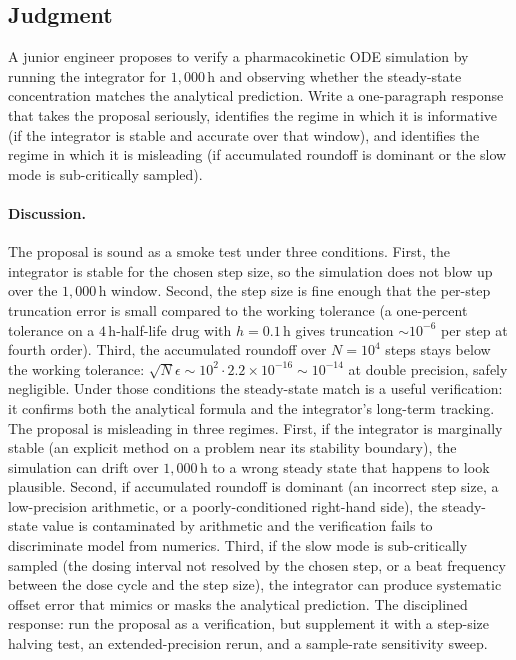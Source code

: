 \subsection*{Judgment}

\begin{exercise}
A junior engineer proposes to verify a pharmacokinetic ODE
simulation by running the integrator for $1{,}000\,\si{\hour}$
and observing whether the steady-state concentration matches the
analytical prediction. Write a one-paragraph response that takes
the proposal seriously, identifies the regime in which it is
informative (if the integrator is stable and accurate over that
window), and identifies the regime in which it is misleading (if
accumulated roundoff is dominant or the slow mode is sub-critically
sampled).

\paragraph{Discussion.} The proposal is sound as a smoke test
under three conditions. First, the integrator is stable for
the chosen step size, so the simulation does not blow up over
the $1{,}000\,\si{\hour}$ window. Second, the step size is fine
enough that the per-step truncation error is small compared to
the working tolerance (a one-percent tolerance on a $4\,\si{
\hour}$-half-life drug with $h = 0.1\,\si{\hour}$ gives
truncation $\sim 10^{-6}$ per step at fourth order). Third, the
accumulated roundoff over $N = 10^{4}$ steps stays below the
working tolerance: $\sqrt{N} \epsilon \sim 10^{2} \cdot 2.2
\times 10^{-16} \sim 10^{-14}$ at double precision, safely
negligible. Under those conditions the steady-state match is a
useful verification: it confirms both the analytical formula
and the integrator's long-term tracking. The proposal is
misleading in three regimes. First, if the integrator is
marginally stable (an explicit method on a problem near its
stability boundary), the simulation can drift over $1{,}000\,
\si{\hour}$ to a wrong steady state that happens to look
plausible. Second, if accumulated roundoff is dominant (an
incorrect step size, a low-precision arithmetic, or a
poorly-conditioned right-hand side), the steady-state value is
contaminated by arithmetic and the verification fails to
discriminate model from numerics. Third, if the slow mode is
sub-critically sampled (the dosing interval not resolved by the
chosen step, or a beat frequency between the dose cycle and the
step size), the integrator can produce systematic offset error
that mimics or masks the analytical prediction. The disciplined
response: run the proposal as a verification, but supplement it
with a step-size halving test, an extended-precision rerun, and
a sample-rate sensitivity sweep.
\end{exercise}

